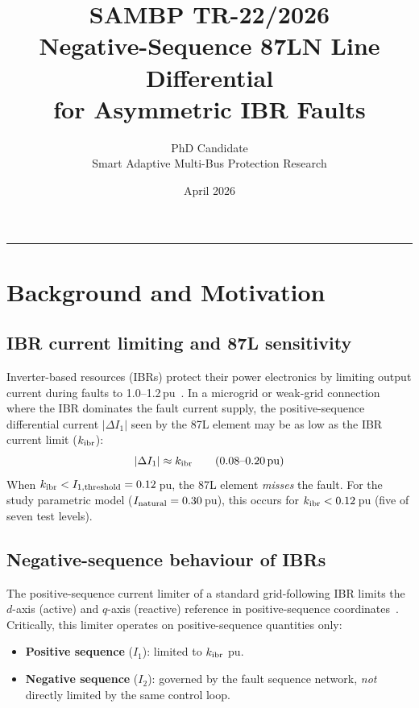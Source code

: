 \documentclass[11pt, a4paper]{article}
\title{\textbf{SAMBP TR-22/2026}\\[4pt]
       \large Negative-Sequence 87LN Line Differential\\
       for Asymmetric IBR Faults}
\author{PhD Candidate\\[2pt]
        \small Smart Adaptive Multi-Bus Protection Research}
\date{April 2026}
\begin{document}
\maketitle
\tableofcontents
\vspace{6pt}\hrule\vspace{10pt}

\section{Background and Motivation}
\label{sec:background}

\subsection{IBR current limiting and 87L sensitivity}

Inverter-based resources (IBRs) protect their power electronics by limiting
output current during faults to 1.0--1.2\,pu~\cite{Plet2011,Hooshyar2019}.
In a microgrid or weak-grid connection where the IBR dominates the fault
current supply, the positive-sequence differential current
$|\Delta I_1|$ seen by the 87L element may be as low as the IBR current
limit ($k_{\rm ibr}$):
\begin{equation}
  |\Delta I_1| \approx k_{\rm ibr} \qquad (0.08\text{--}0.20\,\text{pu})
\end{equation}
When $k_{\rm ibr} < I_{1,\rm threshold} = 0.12$\,pu, the 87L element
\emph{misses} the fault.  For the study parametric model ($I_{\rm natural}
= 0.30$\,pu), this occurs for $k_{\rm ibr} < 0.12$\,pu (five of seven test
levels).

\subsection{Negative-sequence behaviour of IBRs}

The positive-sequence current limiter of a standard grid-following IBR
limits the $d$-axis (active) and $q$-axis (reactive) reference in
positive-sequence coordinates~\cite{ENTSO_RfG}.  Critically, this limiter
operates on positive-sequence quantities only:
\begin{itemize}
  \item \textbf{Positive sequence} ($I_1$): limited to $k_{\rm ibr}$ pu.
  \item \textbf{Negative sequence} ($I_2$): governed by the fault sequence
        network, \emph{not} directly limited by the same control loop.
\end{itemize}
\end{document}
